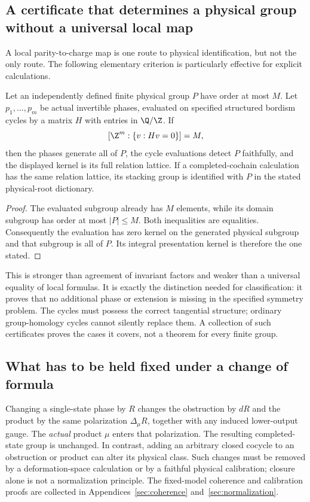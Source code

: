 \subsection{A certificate that determines a physical group without a universal local map}
A local parity-to-charge map is one route to physical identification, but not the only route. The following elementary criterion is particularly effective for explicit calculations.

\begin{theorem}\label{thm:recognition}
Let an independently defined finite physical group $P$ have order at most $M$. Let $p_1,\ldots,p_m$ be actual invertible phases, evaluated on specified structured bordism cycles by a matrix $H$ with entries in $\Q/\Z$. If
\[
[\Z^m:\{v:Hv=0\}]=M,
\]
then the phases generate all of $P$, the cycle evaluations detect $P$ faithfully, and the displayed kernel is its full relation lattice. If a completed-cochain calculation has the same relation lattice, its stacking group is identified with $P$ in the stated physical-root dictionary.
\end{theorem}
\begin{proof}
The evaluated subgroup already has $M$ elements, while its domain subgroup has order at most $|P|\le M$. Both inequalities are equalities. Consequently the evaluation has zero kernel on the generated physical subgroup and that subgroup is all of $P$. Its integral presentation kernel is therefore the one stated.
\end{proof}

This is stronger than agreement of invariant factors and weaker than a universal equality of local formulas. It is exactly the distinction needed for classification: it proves that no additional phase or extension is missing in the specified symmetry problem. The cycles must possess the correct tangential structure; ordinary group-homology cycles cannot silently replace them. A collection of such certificates proves the cases it covers, not a theorem for every finite group.

\subsection{What has to be held fixed under a change of formula}
Changing a single-state phase by $R$ changes the obstruction by $dR$ and the product by the same polarization $\Delta_\mu R$, together with any induced lower-output gauge. The \emph{actual} product $\mu$ enters that polarization. The resulting completed-state group is unchanged. In contrast, adding an arbitrary closed cocycle to an obstruction or product can alter its physical class. Such changes must be removed by a deformation-space calculation or by a faithful physical calibration; closure alone is not a normalization principle. The fixed-model coherence and calibration proofs are collected in Appendices~\ref{sec:coherence} and~\ref{sec:normalization}.
